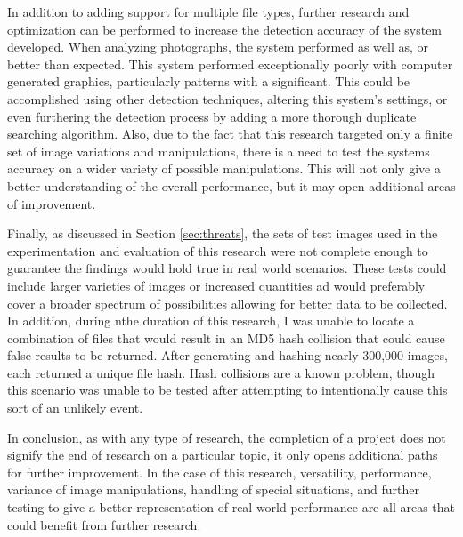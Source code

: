 In addition to adding support for multiple file types, further research and optimization can be performed to increase the detection accuracy of the system developed. When analyzing photographs, the system performed as well as, or better than expected. This system performed exceptionally poorly with computer generated graphics, particularly patterns with a significant. This could be accomplished using other detection techniques, altering this system's settings, or even furthering the detection process by adding a more thorough duplicate searching algorithm. Also, due to the fact that this research targeted only a finite set of image variations and manipulations, there is a need to test the systems accuracy on a wider variety of possible manipulations. This will not only give a better understanding of the overall performance, but it may open additional areas of improvement.

Finally, as discussed in Section \ref{sec:threats}, the sets of test images used in the experimentation and evaluation of this research were not complete enough to guarantee the findings would hold true in real world scenarios. These tests could include larger varieties of images or increased quantities ad would preferably cover a broader spectrum of possibilities allowing for better data to be collected. In addition, during nthe duration of this research, I was unable to locate a combination of files that would result in an MD5 hash collision that could cause false results to be returned. After generating and hashing nearly 300,000 images, each returned a unique file hash. Hash collisions are a known problem, though this scenario was unable to be tested after attempting to intentionally cause this sort of an unlikely event.

In conclusion, as with any type of research, the completion of a project does not signify the end of research on a particular topic, it only opens additional paths for further improvement. In the case of this research, versatility, performance, variance of image manipulations, handling of special situations, and further testing to give a better representation of real world performance are all areas that could benefit from further research.